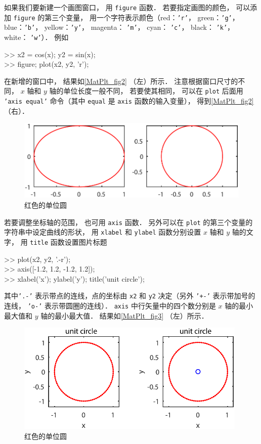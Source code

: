 如果我们要新建一个画图窗口， 用 \texttt{figure} 函数． 若要指定画图的颜色， 可以添加 \texttt{figure} 的第三个变量， 用一个字符表示颜色（red：\texttt{'r'}， green：\texttt{'g'}， blue：\texttt{'b'}， yellow：\texttt{'y'}， magenta： \texttt{'m'}， cyan： \texttt{'c'}， black： \texttt{'k'}， white： \texttt{'w'}）． 例如
\begin{Command}
>> x2 = cos(x); y2 = sin(x);\\
>> figure; plot(x2, y2, 'r');
\end{Command}
在新增的窗口中， 结果如\autoref{MatPlt_fig2} （左）所示． 注意根据窗口尺寸的不同， $x$ 轴和 $y$ 轴的单位长度一般不同， 若要使其相同， 可以在 \texttt{plot} 后面用 \texttt{'axis equal'} 命令（其中 \texttt{equal} 是 \texttt{axis} 函数的输入变量）， 得到\autoref{MatPlt_fig2} （右）．
\begin{figure}[ht]
\centering
\includegraphics[width=13cm]{./figures/MatPlt2.pdf}
\caption{红色的单位圆} \label{MatPlt_fig2}
\end{figure}
若要调整坐标轴的范围， 也可用 \texttt{axis} 函数． 另外可以在 \texttt{plot} 的第三个变量的字符串中设定曲线的形状， 用 \texttt{xlabel} 和 \texttt{ylabel} 函数分别设置 $x$ 轴和 $y$ 轴的文字， 用 \texttt{title} 函数设置图片标题
\begin{Command}
>> plot(x2, y2, '.-r');\\
>> axis([-1.2, 1.2, -1.2, 1.2]);\\
>> xlabel('x'); ylabel('y'); title('unit circle');
\end{Command}
其中\texttt{'.-'} 表示带点的连线，点的坐标由 \texttt{x2} 和 \texttt{y2} 决定（另外 \texttt{'+-'} 表示带加号的连线， \texttt{'o-'} 表示带圆圈的连线）． \texttt{axis} 中行矢量中的四个数分别是 $x$ 轴的最小最大值和 $y$ 轴的最小最大值． 结果如\autoref{MatPlt_fig3} （左）所示．
\begin{figure}[ht]
\centering
\includegraphics[width=11cm]{./figures/MatPlt3.pdf}
\caption{红色的单位圆} \label{MatPlt_fig3}
\end{figure}


